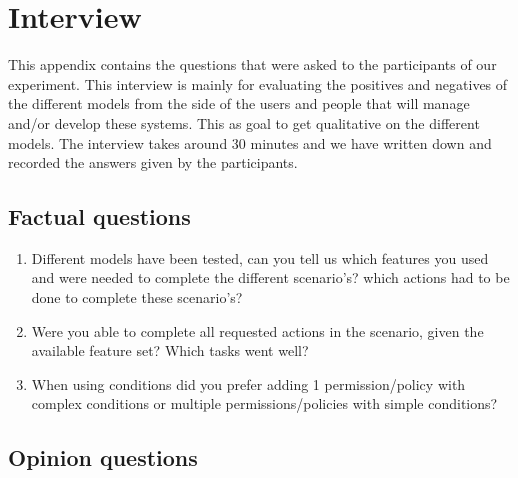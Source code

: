 \chapter{Interview}
\label{appendix:interview}

This appendix contains the questions that were asked to the participants of our experiment.
This interview is mainly for evaluating the positives and negatives of the different models from the side of the users and people that will manage and/or develop these systems.
This as goal to get qualitative on the different models.
The interview takes around 30 minutes and we have written down and recorded the answers given by the participants.

\section{Factual questions}

\begin{enumerate}
    \item Different models have been tested, can you tell us which features you used and were needed to complete the different scenario's? which actions had to be done to complete these scenario's?
    
    \item Were you able to complete all requested actions in the scenario, given the available feature set? Which tasks went well?
   
    \item When using conditions did you prefer adding 1 permission/policy with complex conditions or multiple permissions/policies with simple conditions?
    
\end{enumerate}

\clearpage

\section{Opinion questions}

